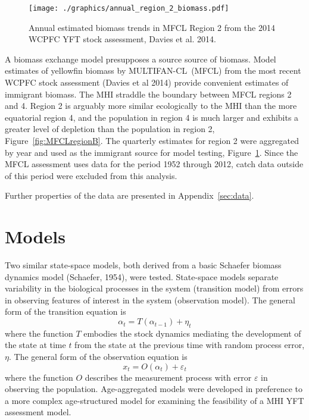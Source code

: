 \documentclass[12pt,letterpaper,twoside]{article}
\newcommand\MFCL{MULTIFAN-CL}
\begin{document}
\begin{figure}[t]
\begin{center}
\texttt{[image: ./graphics/annual\_region\_2\_biomass.pdf]}
\caption{\label{fig:r2biomass}
Annual estimated biomass trends in MFCL Region 2 from the 2014 WCPFC YFT
stock assessment, Davies et al. 2014.
}
\end{center}
\end{figure}
A biomass exchange model presupposes a source source of biomass.
Model estimates of yellowfin biomass by \MFCL\ (MFCL)
from the most recent WCPFC stock assessment (Davies et al 2014) 
provide convenient estimates of immigrant biomass. 
The MHI straddle the boundary between MFCL regions 2 and 4.
Region 2 is arguably
more similar ecologically to the MHI than the more equatorial region
4, and the population in region 4 is much larger and exhibits a greater level
of depletion than the population in region 2, Figure~\ref{fig:MFCLregionB}.
The quarterly estimates for
region 2 were aggregated by year and used as the immigrant source for
model testing, Figure~\ref{fig:r2biomass}.
Since the MFCL assessment uses data for the period 1952 through 2012,
catch data outside of this period were excluded from this analysis.


Further properties of the data are presented in Appendix~\ref{sec:data}. 

\section{Models}
Two similar state-space models, both derived from a basic
Schaefer biomass dynamics model (Schaefer, 1954), were tested.
State-space models separate variability in the biological
processes in the system (transition model)
from errors in observing features of interest
in the system (observation model). 
The general form of the transition equation is
\begin{equation}
\alpha_t=T(\alpha_{t-1}) + \eta_t
\end{equation}
where the function $T$ embodies the stock dynamics mediating the
development of the state at time $t$ from the state at the previous
time with random process error, $\eta$.
The general form of the observation equation is
\begin{equation}
x_t = O(\alpha_t) + \varepsilon_t
\end{equation}
where the function $O$ describes the measurement process with
error $\varepsilon$ in observing the population.
Age-aggregated models were developed in preference to a more complex
age-structured model for examining the feasibility of a MHI YFT
assessment model.
\end{document}
